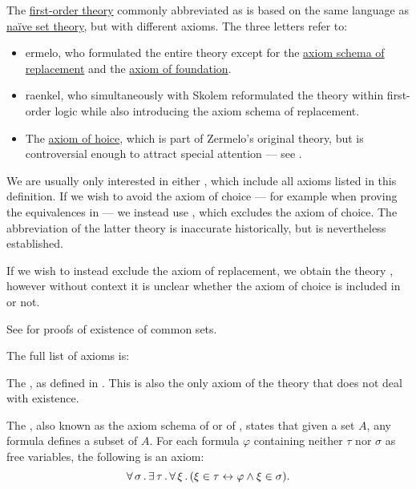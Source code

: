 \begin{definition}\label{def:zfc}
  The \hyperref[def:first_order_theory]{first-order theory} commonly abbreviated as  is based on the same language as \hyperref[def:naive_set_theory]{na\"ive set theory}, but with different axioms. The three letters refer to:
  \begin{itemize}
    \item {}ermelo, who formulated the entire theory except for the \hyperref[def:zfc/replacement]{axiom schema of replacement} and the \hyperref[def:zfc/foundation]{axiom of foundation}.
    \item{} raenkel, who simultaneously with Skolem reformulated the theory within first-order logic while also introducing the axiom schema of replacement.
    \item The \hyperref[def:zfc/choice]{axiom of hoice}, which is part of Zermelo's original theory, but is controversial enough to attract special attention --- see .
  \end{itemize}

  We are usually only interested in either , which include all axioms listed in this definition. If we wish to avoid the axiom of choice --- for example when proving the equivalences in  --- we instead use , which excludes the axiom of choice. The abbreviation of the latter theory is inaccurate historically, but is nevertheless established.

  If we wish to instead exclude the axiom of replacement, we obtain the theory , however without context it is unclear whether the axiom of choice is included in  or not.

  See  for proofs of existence of common sets.

  The full list of axioms is:
  \begin{thmenum}
     The , as defined in . This is also the only axiom of the theory that does not deal with existence.

     The , also known as the axiom schema of  or of , states that given a set \( A \), any formula defines a subset of \( A \). For each formula \( \varphi \) containing neither \( \tau \) nor \( \sigma \) as free variables, the following is an axiom:
    \begin{equation}\label{eq:def:zfc/specification}
      \forall \thinspace \sigma \thinspace . \thinspace \exists \thinspace \tau \thinspace . \thinspace \forall \thinspace \xi \thinspace . \thinspace (\xi \in \tau \leftrightarrow \varphi \wedge \xi \in \sigma).
    \end{equation}


\end{thmenum}
\end{definition}
